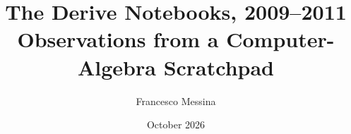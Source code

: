 \documentclass[11pt,a4paper]{article}
\title{\sffamily\bfseries\color{blunotte}The Derive Notebooks, 2009--2011\\[6pt]\large\mdseries\color{inchiostro}Observations from a Computer-Algebra Scratchpad}
\author{Francesco Messina}
\date{October 2026}
\begin{document}
\maketitle

\begin{abstract}

\end{abstract}












\appendix



\end{document}
